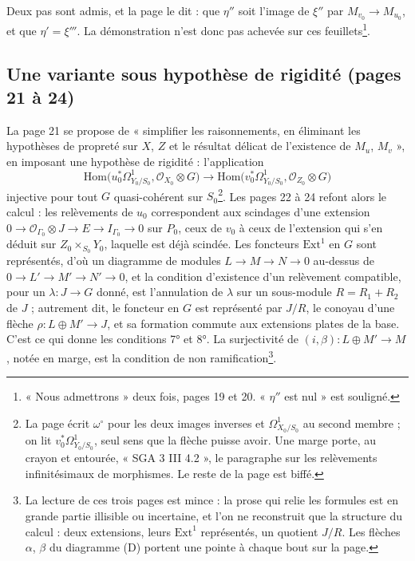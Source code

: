 \documentclass[11pt,a4paper]{article}
\begin{document}
Deux pas sont admis, et la page le dit : que $\eta''$ soit l'image de
$\xi''$ par $M_{v_0} \to M_{u_0}$, et que $\eta' = \xi'''$. La démonstration
n'est donc pas achevée sur ces feuillets\footnote{« Nous admettrons » deux
fois, pages 19 et 20. « $\eta''$ est nul » est souligné.}.

\subsection*{Une variante sous hypothèse de rigidité (pages 21 à 24)}

La page 21 se propose de « simplifier les raisonnements, en éliminant les
hypothèses de propreté sur $X$, $Z$ et le résultat délicat de l'existence de
$M_u$, $M_v$ », en imposant une hypothèse de rigidité : l'application
\[
  \mathrm{Hom}\bigl(u_0^{*}\Omega^1_{Y_0/S_0}, \mathcal{O}_{X_0} \otimes G\bigr)
  \longrightarrow
  \mathrm{Hom}\bigl(v_0^{*}\Omega^1_{Y_0/S_0}, \mathcal{O}_{Z_0} \otimes G\bigr)
\]
injective pour tout $G$ quasi-cohérent sur $S_0$\footnote{La page écrit
$\omega^{\circ}$ pour les deux images inverses et $\Omega^1_{X_0/S_0}$ au second
membre ; on lit $v_0^{*}\Omega^1_{Y_0/S_0}$, seul sens que la flèche puisse
avoir. Une marge porte, au crayon et entourée, « SGA 3 III 4.2 », le
paragraphe sur les relèvements infinitésimaux de morphismes. Le reste de la
page est biffé.}. Les pages 22 à 24 refont alors le calcul : les relèvements
de $u_0$ correspondent aux scindages d'une extension
$0 \to \mathcal{O}_{\Gamma_0} \otimes J \to E \to I_{\Gamma_0} \to 0$ sur $P_0$,
ceux de $v_0$ à ceux de l'extension qui s'en déduit sur $Z_0 \times_{S_0} Y_0$,
laquelle est déjà scindée. Les foncteurs $\mathrm{Ext}^1$ en $G$ sont
représentés, d'où un diagramme de modules $L \to M \to N \to 0$ au-dessus de
$0 \to L' \to M' \to N' \to 0$, et la condition d'existence d'un relèvement
compatible, pour un $\lambda : J \to G$ donné, est l'annulation de $\lambda$ sur
un sous-module $R = R_1 + R_2$ de $J$ ; autrement dit, le foncteur en $G$ est
représenté par $J/R$, le conoyau d'une flèche
$\rho : L \oplus M' \to J$, et sa formation commute aux extensions plates de
la base. C'est ce qui donne les conditions 7° et 8°. La surjectivité de
$(i,\beta) : L \oplus M' \to M$, notée en marge, est la condition de non
ramification\footnote{La lecture de ces trois pages est mince : la prose qui
relie les formules est en grande partie illisible ou incertaine, et l'on
ne reconstruit que la structure du calcul : deux extensions, leurs
$\mathrm{Ext}^1$ représentés, un quotient $J/R$. Les flèches $\alpha$, $\beta$ du
diagramme (D) portent une pointe à chaque bout sur la page.}.
\end{document}
